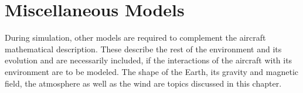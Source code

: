 \chapter{Miscellaneous Models}

During simulation, other models are required to complement the aircraft mathematical description. These describe the rest of the environment and its evolution and are necessarily included, if the interactions of the aircraft with its environment are to be modeled. The shape of the Earth, its gravity and magnetic field, the atmosphere as well as the wind are topics discussed in this chapter.








